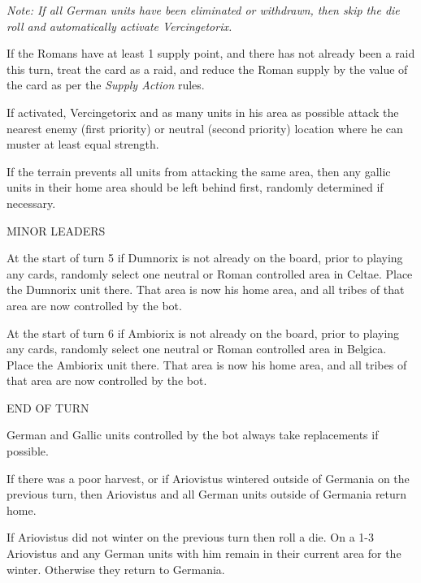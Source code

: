 \textit{Note: If all German units have been eliminated or withdrawn, then skip the die roll and automatically activate Vercingetorix.}

If the Romans have at least 1 supply point, and there has not already been a raid this turn, treat the card as a raid, and reduce the Roman supply by the value of the card as per the \textit{Supply Action} rules.

If activated, Vercingetorix and as many units in his area as possible attack the nearest enemy (first priority) or neutral (second priority) location where he can muster at least equal strength.

If the terrain prevents all units from attacking the same area, then any gallic units in their home area should be left behind first, randomly determined if necessary.

\label{solitaire:minor_leaders}MINOR LEADERS

At the start of turn 5 if Dumnorix is not already on the board, prior to playing any cards, randomly select one neutral or Roman controlled area in Celtae. Place the Dumnorix unit there. That area is now his home area, and all tribes of that area are now controlled by the bot.

At the start of turn 6 if Ambiorix is not already on the board, prior to playing any cards, randomly select one neutral or Roman controlled area in Belgica. Place the Ambiorix unit there. That area is now his home area, and all tribes of that area are now controlled by the bot.

\label{solitaire:end_of_turn}END OF TURN

German and Gallic units controlled by the bot always take replacements if possible.

If there was a poor harvest, or if Ariovistus wintered outside of Germania on the previous turn, then Ariovistus and all German units outside of Germania return home.

If Ariovistus did not winter on the previous turn then roll a die. On a 1-3 Ariovistus and any German units with him remain in their current area for the winter. Otherwise they return to Germania.

